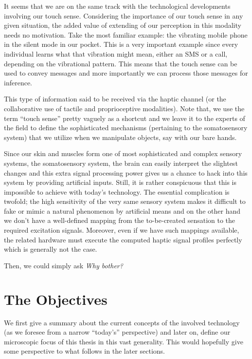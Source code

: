 It seems that we are on the same track with the technological developments involving our touch sense. Considering the importance of our touch sense in any given situation, the added value of extending of our perception in this modality needs no motivation. Take the most familiar example: the vibrating mobile phone in the silent mode in our pocket. This is a very important example since every individual learns what that vibration might mean, either an SMS or a call, depending on the vibrational pattern. This means that the touch sense can be used to convey messages and more importantly we can process those messages for inference. 


This type of information said to be received via the haptic channel (or the collaborative use of tactile and proprioceptive modalities). Note that, we use the term ``touch sense'' pretty vaguely as a shortcut and we leave it to the experts of the field to define the sophisticated mechanisms (pertaining to the somatosensory system) that we utilize when we manipulate objects, say with our bare hands. 


Since our skin and muscles form one of most sophisticated and complex sensory systems, the somatosensory system, the brain can easily interpret the slightest changes and this extra signal processing power gives us a chance to hack into this system by providing artificial inputs. Still, it is rather conspicuous that this is impossible to achieve with today's technology. The essential complication is twofold; the high sensitivity of the very same sensory system makes it difficult to fake or mimic a natural phenomenon by artificial means and on the other hand we don't have a well-defined mapping from the to-be-created sensation to the required excitation signals. Moreover, even if we have such mappings available, the related hardware must execute the computed haptic signal profiles perfectly which is generally not the case.

Then, we could simply ask \emph{Why bother?} 


\section{The Objectives}
\label{sec:intro:obj}

We first give a summary about the current concepts of the involved technology (as we foresee from a narrow ``today's'' perspective) and later on, define our microscopic focus of this thesis in this vast generality. This would hopefully give some perspective to what follows in the later sections.  


